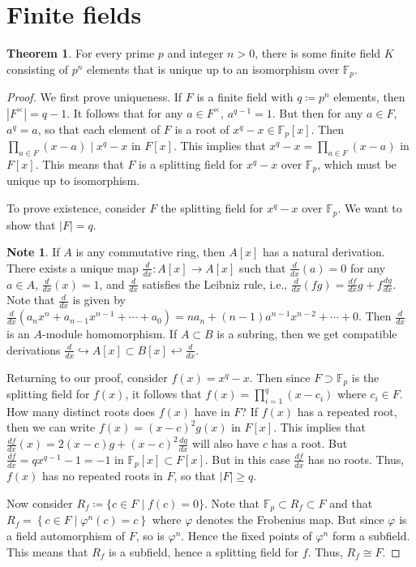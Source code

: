\documentclass[10pt,letterpaper,cm]{nupset}
\theoremstyle{definition}
\newtheorem{note}[definition]{Note}
\theoremstyle{theorem}
\newtheorem{theorem}[definition]{Theorem}
\theoremstyle{remark}
\newcommand{\F}{\mathbb F}
\newcommand{\1}{\mathbf{1}}
\newcommand{\0}{\vec 0}
\begin{document}
\section{Finite fields}

\begin{theorem}
For every prime $p$ and integer $n>0$, there is some finite field $K$ consisting of $p^n$ elements that is unique up to an isomorphism over $\F_p$.
\end{theorem}
\begin{proof}
We first prove uniqueness. If $F$ is a finite field with $q\coloneqq p^n$ elements, then $\left\lvert{F^{\times}}\right\rvert = q-1$. It follows that for any $a \in F^{\times}$,  $a^{q-1} =1$. But then for any $a \in F$, $a^q = a$, so that each element of $F$ is a root of $x^q -x \in \F_p[x]$. Then $\prod_{a\in F}(x-a) \mid x^q -x$ in $F[x]$. This implies that $x^q -x = \prod_{a\in F}(x-a)$ in $F[x]$. This means that $F$ is a splitting field for $x^q-x$ over $\F_p$, which must be unique up to isomorphism.

\smallskip

 To prove existence, consider $F$ the splitting field for $x^q -x$ over $\F_p$. We want to show that $\left\lvert{F}\right\rvert =q$. 
 
\begin{note}
If $A$ is any commutative ring, then $A[x]$ has a natural derivation. There exists a unique map $\frac{d}{dx} : A[x] \to A[x]$ such that $\frac{d}{dx}(a) = 0$ for any $a\in A$, $\frac{d}{dx}(x) =1$, and $\frac{d}{dx}$ satisfies the Leibniz rule, i.e., $\frac{d}{dx}(fg) = \frac{df}{dx}g + f\frac{dg}{dx}$. Note that $\frac{d}{dx}$ is given by $\frac{d}{dx}(a_nx^n  + a_{n-1}x^{n-1} + \cdots + a_0) = na_n + (n-1)a^{n-1}x^{n-2} + \cdots + 0$. Then $\frac{d}{dx}$ is an $A$-module homomorphism. If $A \subset B$ is a subring, then we get compatible derivations $\frac{d}{dx} \hookrightarrow A[x] \subset B[x] \hookleftarrow \frac{d}{dx}$. 
\end{note}

Returning to our proof, consider $f(x) = x^q -x$. Then since $F \supset \F_p$ is the splitting field for $f(x)$, it follows that $f(x) = \prod_{i=1}^q (x-c_i)$ where $c_i \in F$. How many distinct roots does $f(x)$ have in $F$? If $f(x)$ has a repeated root, then we can write $f(x) = \left(x-c\right)^2g(x)$ in $F[x]$. This implies that $\frac{df}{dx}(x) = 2(x-c)g + (x-c)^2 \frac{dg}{dx}$ will also have $c$ has a root. But $\frac{df}{dx} = qx^{q-1} -1 = {-1}$ in $\F_p[x]\subset F[x]$. But in this case $\frac{df}{dx}$ has no roots. Thus, $f(x)$ has no repeated roots in $F$, so that $\left\lvert{F}\right\rvert \geq q$.

Now consider $R_f\coloneqq  \{c \in F \mid f(c) = 0\}$. Note that $\F_p \subset R_f \subset F$ and that  $R_f = \left\{c\in F \mid \varphi^n(c) = c\right\}$ where $\varphi$ denotes the Frobenius map. But since $\varphi$ is a field automorphism of $F$, so is $\varphi^n$. Hence the fixed points of $\varphi^n$ form a subfield. This means that $R_f$ is a subfield, hence a splitting field for $f$. Thus, $R_f \cong F$. 
\end{proof}
\end{document}
